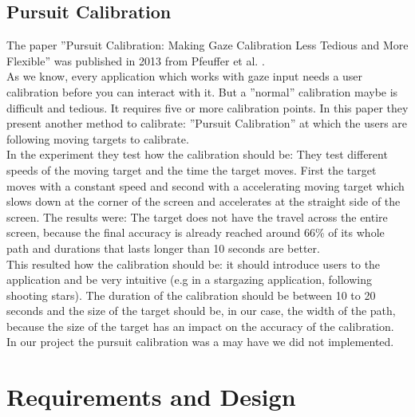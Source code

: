 \documentclass{sigchi}
\begin{document}
\subsection{Pursuit Calibration}
The paper ''Pursuit Calibration: Making Gaze Calibration Less Tedious and More Flexible'' was published in 2013 from Pfeuffer et al.  \cite{pfeuffer2013pursuit}.\\
As we know, every application which works with gaze input needs a user calibration before you can interact with it. But a ''normal'' calibration maybe is difficult and tedious. It requires five or more calibration points. In this paper they present another method to calibrate: ''Pursuit Calibration'' at which the users are following moving targets to calibrate.\\
In the experiment they test how the calibration should be: They test different speeds of the moving target and the time the target moves. First the target moves with a constant speed and second with a accelerating moving target which slows down at the corner of the screen and accelerates at the straight side of the screen. The results were: The target does not have the travel across the entire screen, because the final accuracy is already reached around 66\% of its whole path and durations that lasts longer than 10 seconds are better.\\
This resulted how the calibration should be: it should introduce users to the application and be very intuitive (e.g in a stargazing application, following shooting stars). The duration of the calibration should be between 10 to 20 seconds and the size of the target should be, in our case, the width of the path, because the size of the target has an impact on the accuracy of the calibration.\\
In our project the pursuit calibration was a may have we did not implemented.

\section{Requirements and Design}
\end{document}
